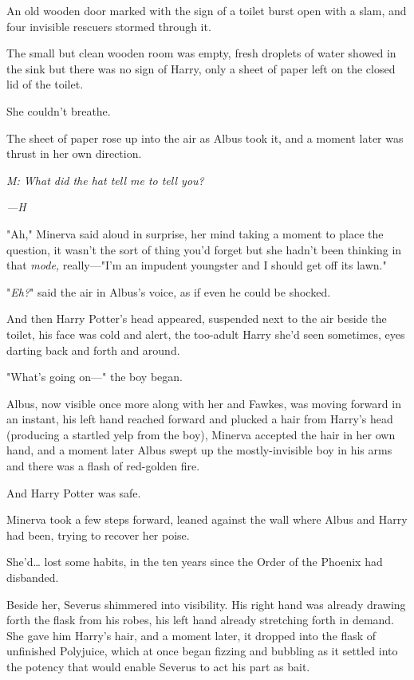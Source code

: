 An old wooden door marked with the sign of a toilet burst open with a slam, and 
four invisible rescuers stormed through it.

The small but clean wooden room was empty, fresh droplets of water showed in 
the sink but there was no sign of Harry, only a sheet of paper left on the 
closed lid of the toilet.

She couldn't breathe.

The sheet of paper rose up into the air as Albus took it, and a moment later 
was thrust in her own direction.

\emph{M: What did the hat tell me to tell you?}

\emph{---H}

"Ah," Minerva said aloud in surprise, her mind taking a moment to place the 
question, it wasn't the sort of thing you'd forget but she hadn't been thinking 
in that \emph{mode,} really---"I'm an impudent youngster and I should get off 
its lawn."

"\emph{Eh?}" said the air in Albus's voice, as if even he could be shocked.

And then Harry Potter's head appeared, suspended next to the air beside the 
toilet, his face was cold and alert, the too-adult Harry she'd seen sometimes, 
eyes darting back and forth and around.

"What's going on---" the boy began.

Albus, now visible once more along with her and Fawkes, was moving forward in 
an instant, his left hand reached forward and plucked a hair from Harry's head 
(producing a startled yelp from the boy), Minerva accepted the hair in her own 
hand, and a moment later Albus swept up the mostly-invisible boy in his arms 
and there was a flash of red-golden fire.

And Harry Potter was safe.

Minerva took a few steps forward, leaned against the wall where Albus and Harry 
had been, trying to recover her poise.

She'd{\ldots} lost some habits, in the ten years since the Order of the Phoenix 
had disbanded.

Beside her, Severus shimmered into visibility. His right hand was already 
drawing forth the flask from his robes, his left hand already stretching forth 
in demand. She gave him Harry's hair, and a moment later, it dropped into the 
flask of unfinished Polyjuice, which at once began fizzing and bubbling as it 
settled into the potency that would enable Severus to act his part as bait.

